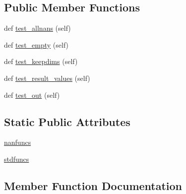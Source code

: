 \subsection*{Public Member Functions}
\begin{DoxyCompactItemize}
\item 
def \hyperlink{classnumpy_1_1lib_1_1tests_1_1test__nanfunctions_1_1TestNanFunctions__CumSumProd_aad476953f329a66ef03560cf33b2ed0d}{test\+\_\+allnans} (self)
\item 
def \hyperlink{classnumpy_1_1lib_1_1tests_1_1test__nanfunctions_1_1TestNanFunctions__CumSumProd_a3ccae1f148c2c51d5cd17fc96646d4b2}{test\+\_\+empty} (self)
\item 
def \hyperlink{classnumpy_1_1lib_1_1tests_1_1test__nanfunctions_1_1TestNanFunctions__CumSumProd_a69e1fdedea3ae0661b150ca08a6fbf46}{test\+\_\+keepdims} (self)
\item 
def \hyperlink{classnumpy_1_1lib_1_1tests_1_1test__nanfunctions_1_1TestNanFunctions__CumSumProd_a9bb7dfa80a00517bc5ab1af36e0e3ae1}{test\+\_\+result\+\_\+values} (self)
\item 
def \hyperlink{classnumpy_1_1lib_1_1tests_1_1test__nanfunctions_1_1TestNanFunctions__CumSumProd_ac17e018c26bc2e7e6d70a4d7510fcdf4}{test\+\_\+out} (self)
\end{DoxyCompactItemize}
\subsection*{Static Public Attributes}
\begin{DoxyCompactItemize}
\item 
\hyperlink{classnumpy_1_1lib_1_1tests_1_1test__nanfunctions_1_1TestNanFunctions__CumSumProd_aceb856fad1e41969deb8dec1e57a1403}{nanfuncs}
\item 
\hyperlink{classnumpy_1_1lib_1_1tests_1_1test__nanfunctions_1_1TestNanFunctions__CumSumProd_aaa3d155660986efdb1d88404ebca00e9}{stdfuncs}
\end{DoxyCompactItemize}


\subsection{Member Function Documentation}
\mbox{\label{classnumpy_1_1lib_1_1tests_1_1test__nanfunctions_1_1TestNanFunctions__CumSumProd_aad476953f329a66ef03560cf33b2ed0d}} 
